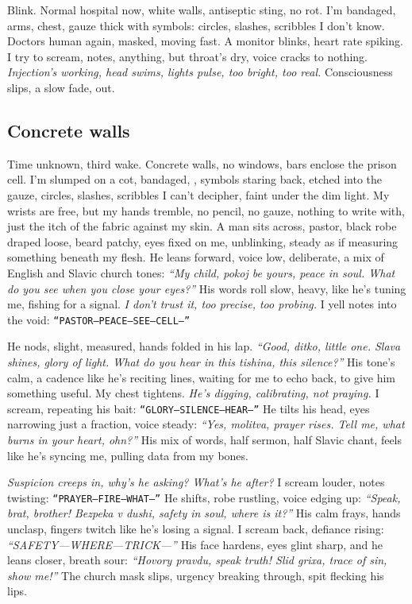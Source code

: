 \documentclass[12pt]{article}
\newcommand{\note}[1]{\texttt{#1}}
\begin{document}
Blink. Normal hospital now, white walls, antiseptic sting, no rot. I’m bandaged, arms, chest, gauze thick with symbols: circles, slashes, scribbles I don’t know. Doctors human again, masked, moving fast. A monitor blinks, heart rate spiking. I try to scream, notes, anything, but throat’s dry, voice cracks to nothing. \textit{Injection’s working, head swims, lights pulse, too bright, too real.} Consciousness slips, a slow fade, out.

\subsection*{Concrete walls}
Time unknown, third wake. Concrete walls, no windows, bars enclose the prison cell. I’m slumped on a cot, bandaged, , symbols staring back, etched into the gauze, circles, slashes, scribbles I can’t decipher, faint under the dim light. My wrists are free, but my hands tremble, no pencil, no gauze, nothing to write with, just the itch of the fabric against my skin. A man sits across, pastor, black robe draped loose, beard patchy, eyes fixed on me, unblinking, steady as if measuring something beneath my flesh. He leans forward, voice low, deliberate, a mix of English and Slavic church tones: \textit{“My child, pokoj be yours, peace in soul. What do you see when you close your eyes?”} His words roll slow, heavy, like he’s tuning me, fishing for a signal. \textit{I don’t trust it, too precise, too probing.} I yell notes into the void: \note{“PASTOR—PEACE—SEE—CELL—”}

He nods, slight, measured, hands folded in his lap. \textit{“Good, ditko, little one. Slava shines, glory of light. What do you hear in this tishina, this silence?”} His tone’s calm, a cadence like he’s reciting lines, waiting for me to echo back, to give him something useful. My chest tightens. \textit{He’s digging, calibrating, not praying.} I scream, repeating his bait: \note{“GLORY—SILENCE—HEAR—”} He tilts his head, eyes narrowing just a fraction, voice steady: \textit{“Yes, molitva, prayer rises. Tell me, what burns in your heart, ohn?”} His mix of words, half sermon, half Slavic chant, feels like he’s syncing me, pulling data from my bones.

\textit{Suspicion creeps in, why’s he asking? What’s he after?} I scream louder, notes twisting: \note{“PRAYER—FIRE—WHAT—”} He shifts, robe rustling, voice edging up: \textit{“Speak, brat, brother! Bezpeka v dushi, safety in soul, where is it?”} His calm frays, hands unclasp, fingers twitch like he’s losing a signal. I scream back, defiance rising: \textit{“SAFETY—WHERE—TRICK—”} His face hardens, eyes glint sharp, and he leans closer, breath sour: \textit{“Hovory pravdu, speak truth! Slid grixa, trace of sin, show me!”} The church mask slips, urgency breaking through, spit flecking his lips.
\end{document}

